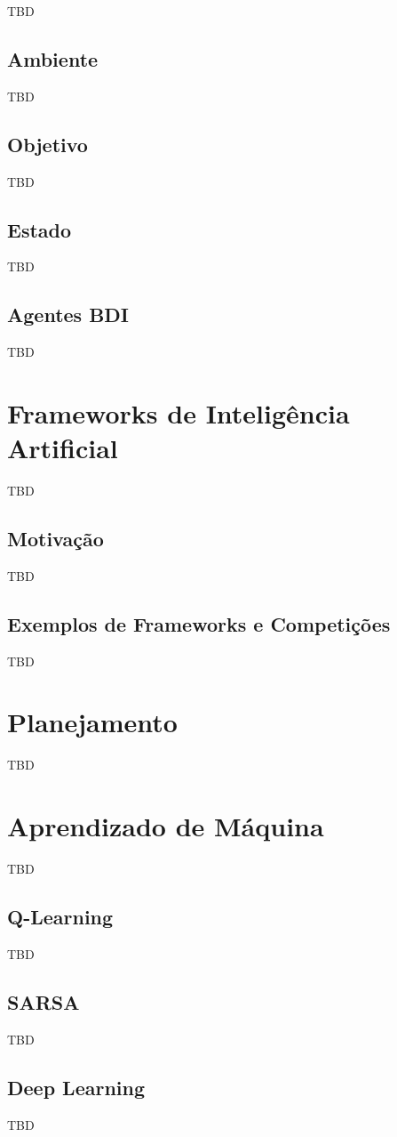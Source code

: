 TBD

\subsection{Ambiente}

TBD

\subsection{Objetivo}

TBD

\subsection{Estado}

TBD

\subsection{Agentes BDI}

TBD

\section{Frameworks de Inteligência Artificial}

TBD

\subsection{Motivação}

TBD

\subsection{Exemplos de Frameworks e Competições}

TBD

\section{Planejamento}

TBD

\section{Aprendizado de Máquina}

TBD

\subsection{Q-Learning}

TBD

\subsection{SARSA}

TBD

\subsection{Deep Learning}

TBD
